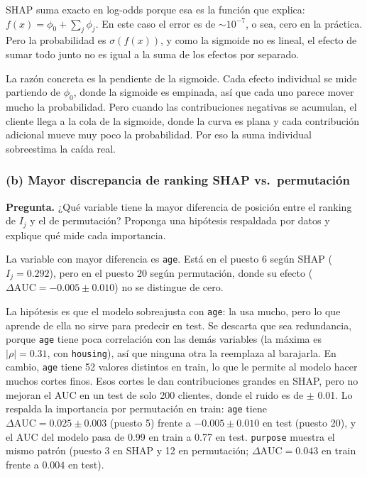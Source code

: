 \documentclass[11pt]{article}
\renewcommand{\_}{\textunderscore\allowbreak{}}
\begin{document}
SHAP suma exacto en log-odds porque esa es la función que explica: \(f(x) = \phi_0 + \sum_j \phi_j\). En este caso el error es de \(\sim10^{-7}\), o sea, cero en la práctica. Pero la probabilidad es \(\sigma(f(x))\), y como la sigmoide no es lineal, el efecto de sumar todo junto no es igual a la suma de los efectos por separado.

La razón concreta es la pendiente de la sigmoide. Cada efecto individual se mide partiendo de \(\phi_0\), donde la sigmoide es empinada, así que cada uno parece mover mucho la probabilidad. Pero cuando las contribuciones negativas se acumulan, el cliente llega a la cola de la sigmoide, donde la curva es plana y cada contribución adicional mueve muy poco la probabilidad. Por eso la suma individual sobreestima la caída real.

\subsubsection*{(b) Mayor discrepancia de ranking SHAP vs.\ permutación}
\begin{tcolorbox}[colback=yellow!12, colframe=orange!70!black, boxrule=0.5pt, left=4pt, right=4pt]
\textbf{Pregunta.} ¿Qué variable tiene la mayor diferencia de posición entre el ranking de \(I_j\) y el de permutación? Proponga una hipótesis respaldada por datos y explique qué mide cada importancia.
\end{tcolorbox}

La variable con mayor diferencia es \texttt{age}. Está en el puesto 6 según SHAP (\(I_j = 0.292\)), pero en el puesto 20 según permutación, donde su efecto (\(\Delta\text{AUC} = -0.005 \pm 0.010\)) no se distingue de cero.

La hipótesis es que el modelo sobreajusta con \texttt{age}: la usa mucho, pero lo que aprende de ella no sirve para predecir en test. Se descarta que sea redundancia, porque \texttt{age} tiene poca correlación con las demás variables (la máxima es \(|\rho| = 0.31\), con \texttt{housing}), así que ninguna otra la reemplaza al barajarla. En cambio, \texttt{age} tiene 52 valores distintos en train, lo que le permite al modelo hacer muchos cortes finos. Esos cortes le dan contribuciones grandes en SHAP, pero no mejoran el AUC en un test de solo 200 clientes, donde el ruido es de \(\pm\) 0.01. Lo respalda la importancia por permutación en train: \texttt{age} tiene \(\Delta\text{AUC} = 0.025 \pm 0.003\) (puesto 5) frente a \(-0.005 \pm 0.010\) en test (puesto 20), y el AUC del modelo pasa de 0.99 en train a 0.77 en test. \texttt{purpose} muestra el mismo patrón (puesto 3 en SHAP y 12 en permutación; \(\Delta\text{AUC} = 0.043\) en train frente a \(0.004\) en test).
\end{document}
